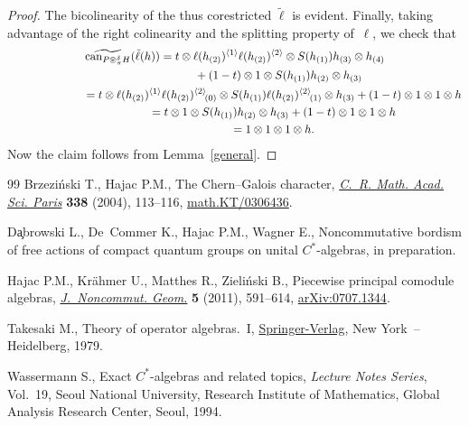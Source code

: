 \documentclass[11pt]{article}
\numberwithin{equation}{section}
\let\originalcedilla\c
\renewcommand{\c}[1]{{\fontspec{DejaVu Serif}\originalcedilla{#1}}}
\begin{document}
\begin{proof}
The bicolinearity of the thus corestricted $\tilde\ell$ is evident. Finally, taking
advantage of the right colinearity and the splitting property of~$\ell$, we check that
\begin{gather*}
 \widetilde{\operatorname{can}_{P\circledast^\delta_\pi H}}(\tilde\ell (h)) =
 t \otimes  \ell (h_{(2)})^{\langle 1\rangle}\ell (h_{(2)})^{\langle 2\rangle}
\otimes S(h_{(1)})  h_{(3)}\otimes h_{(4)}\\
\hphantom{\widetilde{\operatorname{can}_{P\circledast^\delta_\pi H}}(\tilde\ell (h)) =}{}
+ (1-t) \otimes 1 \otimes S(h_{(1)})h_{(2)} \otimes h_{(3)}
 \\
\hphantom{\widetilde{\operatorname{can}_{P\circledast^\delta_\pi H}}(\tilde\ell (h))}{} =  t \otimes  \ell (h_{(2)})^{\langle 1\rangle}\ell (h_{(2)})^{\langle 2\rangle}\!{}_{(0)} \otimes S(h_{(1)})
\ell (h_{(2)})^{\langle 2\rangle}\!{}_{(1)}\otimes h_{(3)}
+ (1-t) \otimes 1 \otimes 1 \otimes h
 \\
\hphantom{\widetilde{\operatorname{can}_{P\circledast^\delta_\pi H}}(\tilde\ell (h))}{} =  t \otimes  1 \otimes S(h_{(1)})  h_{(2)}\otimes h_{(3)}
+ (1-t) \otimes 1 \otimes 1 \otimes h
 \\
\hphantom{\widetilde{\operatorname{can}_{P\circledast^\delta_\pi H}}(\tilde\ell (h))}{}
 =  1 \otimes  1 \otimes 1 \otimes h.
\end{gather*}
Now the claim follows from Lemma~\ref{general}.
\end{proof}
\begin{thebibliography}{99}
Brzezi{\'n}ski T., Hajac P.M., The {C}hern--{G}alois character, \href{http://dx.doi.org/10.1016/j.crma.2003.11.009}{\textit{C.~R.
  Math. Acad. Sci. Paris}} \textbf{338} (2004), 113--116,
  \href{http://arxiv.org/abs/math.KT/0306436}{math.KT/0306436}.

D\c{a}browski L., De~Commer K., Hajac P.M., Wagner E., Noncommutative bordism
  of free actions of compact quantum groups on unital $C^*$-algebras, {i}n
  preparation.

Hajac P.M., Kr{\"a}hmer U., Matthes R., Zieli{\'n}ski B., Piecewise principal
  comodule algebras, \href{http://dx.doi.org/10.4171/JNCG/88}{\textit{J.~Noncommut. Geom.}} \textbf{5} (2011), 591--614,
  \href{http://arxiv.org/abs/0707.1344}{arXiv:0707.1344}.

Takesaki M., Theory of operator algebras.~{I}, \href{http://dx.doi.org/10.1007/978-1-4612-6188-9}{Springer-Verlag}, New York~--
  Heidelberg, 1979.

Wassermann S., Exact {$C^*$}-algebras and related topics, \textit{Lecture Notes
  Series}, Vol.~19, Seoul National University, Research Institute of
  Mathematics, Global Analysis Research Center, Seoul, 1994.

\end{thebibliography}
\end{document}
